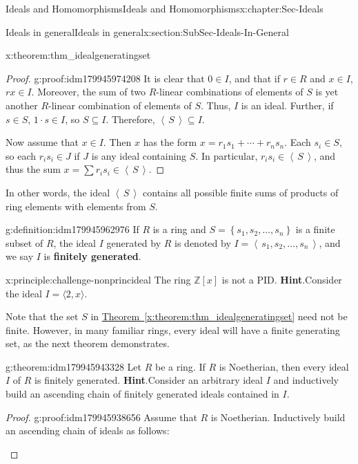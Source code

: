 \documentclass[oneside,10pt,]{book}
\newcommand{\blocktitlefont}{\relax}
\newcommand{\xreffont}{\relax}
\newcommand{\terminology}[1]{\textbf{#1}}
\numberwithin{equation}{section}
\newcommand{\ideal}[1]{\left\langle\, #1 \,\right\rangle}
\newcommand{\set}[1]{\left\{ {#1} \right\}}
\def\Z{{\mathbb Z}}
\begin{document}
\begin{chapterptx}{Ideals and Homomorphisms}{}{Ideals and Homomorphisms}{}{}{x:chapter:Sec-Ideals}
\begin{sectionptx}{Ideals in general}{}{Ideals in general}{}{}{x:section:SubSec-Ideals-In-General}
\begin{theorem}{}{}{x:theorem:thm_idealgeneratingset}
%
\end{theorem}
\begin{proof}{}{g:proof:idm179945974208}
It is clear that \(0\in I\), and that if \(r\in R\) and \(x\in I\), \(rx\in I\). Moreover, the sum of two \(R\)-linear combinations of elements of \(S\) is yet another \(R\)-linear combination of elements of \(S\). Thus, \(I\) is an ideal. Further, if \(s\in S\), \(1\cdot s \in I\), so \(S\subseteq I\). Therefore, \(\ideal{S}\subseteq I\).%
\par
Now assume that \(x\in I\). Then \(x\) has the form \(x = r_1 s_1 + \cdots + r_n s_n\). Each \(s_i \in S\), so each \(r_i s_i \in J\) if \(J\) is any ideal containing \(S\). In particular, \(r_i s_i \in \ideal{S}\), and thus the sum \(x = \sum r_i s_i \in \ideal{S}\).%
\end{proof}
In other words, the ideal \(\ideal{S}\) contains all possible finite sums of products of ring elements with elements from \(S\).%
\begin{definition}{}{g:definition:idm179945962976}%
If \(R\) is a ring and \(S = \set{s_1, s_2, \ldots,
s_n}\) is a finite subset of \(R\), the ideal \(I\) generated by \(R\) is denoted by \(I = \ideal{s_1, s_2, \ldots,
s_n}\), and we say \(I\) is \terminology{finitely generated}.%
\end{definition}
\begin{principle}{}{}{x:principle:challenge-nonprincideal}%
The ring \(\Z[x]\) is not a PID.%
\textbf{\blocktitlefont Hint}.\quad{}Consider the ideal \(I = \langle 2, x \rangle\).%
\end{principle}
Note that the set \(S\) in \hyperref[x:theorem:thm_idealgeneratingset]{Theorem~{\xreffont\ref{x:theorem:thm_idealgeneratingset}}} need not be finite. However, in many familiar rings, every ideal will have a finite generating set, as the next theorem demonstrates.%
\begin{theorem}{}{}{g:theorem:idm179945943328}%
Let \(R\) be a ring. If \(R\) is Noetherian\footnotemark{}, then every ideal \(I\) of \(R\) is finitely generated.%
\textbf{\blocktitlefont Hint}.\quad{}Consider an arbitrary ideal \(I\) and inductively build an ascending chain of finitely generated ideals contained in \(I\).%
\end{theorem}
\begin{proof}{}{g:proof:idm179945938656}
Assume that \(R\) is Noetherian. Inductively build an ascending chain of ideals as follows:%
\begin{itemize}[label=\textbullet]

\end{itemize}
\end{proof}
\end{sectionptx}
\end{chapterptx}
\end{document}
